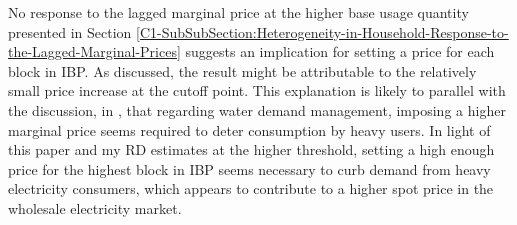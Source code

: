 No response to the lagged marginal price at the higher base usage quantity presented in Section \ref{C1-SubSubSection:Heterogeneity-in-Household-Response-to-the-Lagged-Marginal-Prices} suggests an implication for setting a price for each block in IBP. As discussed, the result might be attributable to the relatively small price increase at the cutoff point. This explanation is likely to parallel with the discussion, in \cite{Does-Marginal-Price-Matter?-A-Regression-Discontinuity-Approach-To-Estimating-Water-Demand_Nataraj-and-Hanemann_2011}, that regarding water demand management, imposing a higher marginal price seems required to deter consumption by heavy users. In light of this paper and my RD estimates at the higher threshold, setting a high enough price for the highest block in IBP seems necessary to curb demand from heavy electricity consumers, which appears to contribute to a higher spot price in the wholesale electricity market. 
